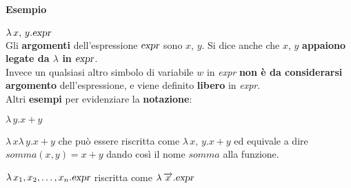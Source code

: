 \documentclass[10pt]{book}
\begin{document}
\paragraph{Esempio} $\lambda\,x,\,y.\textsl{expr}$\\
Gli \textbf{argomenti} dell'espressione $\textsl{expr}$ sono $x$, $y$. Si dice anche che $x$, $y$ \textbf{appaiono legate da $\lambda$ in $\textsl{expr}$}.\\
Invece un qualsiasi altro simbolo di variabile $w$ in \textsl{expr} \textbf{non è da considerarsi argomento} dell'espressione, e viene definito \textbf{libero} in \textsl{expr}.\\
Altri \textbf{esempi} per evidenziare la \textbf{notazione}:
\begin{list}{}{}
	\item $\lambda\, y. x + y$
	\item $\lambda\, x \lambda\, y.x + y$ che può essere riscritta come $\lambda\, x,\,y.x + y$ ed equivale a dire $somma(x, y) = x + y$ dando così il nome $somma$ alla funzione.
	\item $\lambda\, x_1, x_2, \ldots, x_n.\textsl{expr}$ riscritta come $\lambda\, \overrightarrow{x}.\textsl{expr}$
\end{list}
\end{document}
